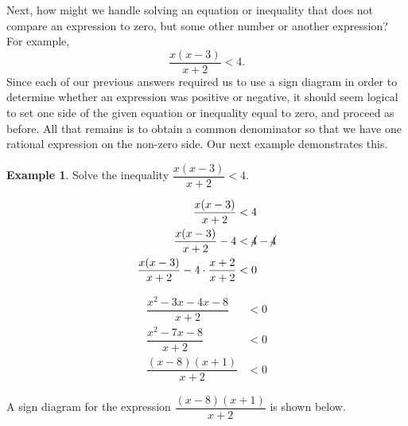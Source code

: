 \documentclass[12pt]{book}
\theoremstyle{definition}
\newtheorem{example}{Example}
\begin{document}
Next, how might we handle solving an equation or inequality that does not compare an expression to zero, but some other number or another expression?  For example, $$\frac{x(x-3)}{x+2}<4.$$
Since each of our previous answers required us to use a sign diagram in order to determine whether an expression was positive or negative, it should seem logical to set one side of the given equation or inequality equal to zero, and proceed as before.
All that remains is to obtain a common denominator so that we have one rational expression on the non-zero side.  Our next example demonstrates this.
\begin{example} Solve the inequality $\dfrac{x(x-3)}{x+2}<4.$
\begin{multicols}{2}
\begin{equation*}
\begin{split}
\dfrac{x(x-3)}{x+2}&<4\\
\dfrac{x(x-3)}{x+2}-4&<\cancel{4}-\cancel{4}\\
\dfrac{x(x-3)}{x+2}-4\cdot\frac{x+2}{x+2}&<0
\end{split}
\end{equation*}

\columnbreak

\begin{equation*}
\begin{split}
\dfrac{x^2-3x-4x-8}{x+2}&<0\\
\dfrac{x^2-7x-8}{x+2}&<0\\
\dfrac{(x-8)(x+1)}{x+2}&<0
\end{split}
\end{equation*}
\end{multicols}
A sign diagram for the expression $\dfrac{(x-8)(x+1)}{x+2}$ is shown below.
\end{example}
\begin{center}
\end{center}
\end{document}
